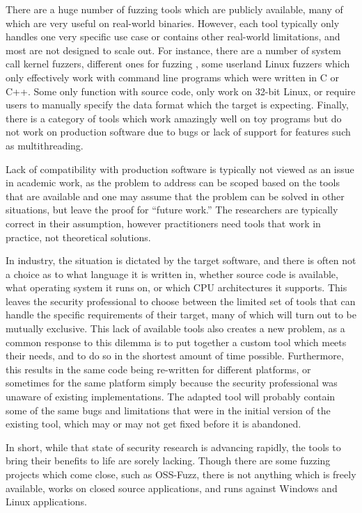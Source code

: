There are a huge number of fuzzing tools\cite{afl,aflosx,winafl,peach22,syzkaller,ossfuzz,driller,radamsa,ni,zzuf,synfuzz,brundlefuzz,honggfuzz,kafl,vuzzer,boofuzz} which are publicly available, many of
which are very useful on real-world binaries.
However, each tool
typically only handles one very specific use case or contains other real-world limitations, and most are not designed to scale
out.  For instance, there are a number of system call kernel fuzzers\cite{syzkaller,trinity,kafl,osxfuzz}, different ones for
fuzzing \IOCTLs{}\cite{ioctlfuzzer,ioctlbf}, some userland Linux fuzzers which only effectively work with
command line programs which were written in C or C++.  Some only function with
source code, only work on 32-bit Linux\cite{vuzzer}, or require users to manually specify
the data format which the target is
expecting.\cite{peach,boofuzz}  Finally, there is a category of tools which work amazingly well
on toy programs but do not work on production software due to bugs or lack of
support for features such as multithreading.\cite{grimmdriller,angrissues}

Lack of compatibility with production software is typically not viewed as an issue in academic work, as the problem to address can be
scoped based on the tools that are available and one may assume that the problem can
be solved in other situations, but leave the proof for ``future work.''  The researchers
are typically correct in their assumption, however practitioners need tools
that work in practice, not theoretical solutions.

In industry, the situation is dictated by the target software,
and there is often not a choice as to what language it is
written in, whether source code is available, what operating system it runs
on, or which CPU architectures it supports. This leaves the security
professional to choose between the limited set of tools that can handle the specific requirements of their target, many of which will
turn out to be mutually exclusive. This lack of available tools also creates a new problem, as a common
response to this dilemma is to put together a custom tool which meets their
needs, and to do so in the shortest amount of time possible.  Furthermore,
this results in the same code being re-written for different platforms, or
sometimes for the same platform simply because the security professional was
unaware of existing implementations.  The adapted tool will probably
contain some of the same bugs and limitations that were in the initial
version of the existing tool, which may or may not get fixed before it is
abandoned.

In short, while that state of security research is advancing rapidly, the
tools to bring their benefits to life are sorely lacking.  Though there are some
fuzzing projects which come close, such as OSS-Fuzz,\cite{ossfuzz} there
is not anything which is freely available, works on closed source applications,
and runs against Windows and Linux applications.
